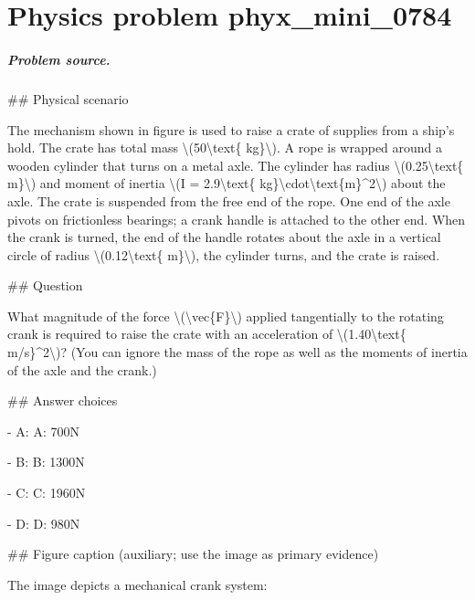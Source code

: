
\chapter{Physics problem phyx\_mini\_0784}
\label{ch:PhyXMiniProblems_problem_phyx_mini_0784}

\paragraph{Problem source.}
\#\# Physical scenario

The mechanism shown in figure is used to raise a crate of supplies from a ship's hold. The crate has total mass \textbackslash{}(50\textbackslash{}text\{ kg\}\textbackslash{}). A rope is wrapped around a wooden cylinder that turns on a metal axle. The cylinder has radius \textbackslash{}(0.25\textbackslash{}text\{ m\}\textbackslash{}) and moment of inertia \textbackslash{}(I = 2.9\textbackslash{}text\{ kg\}\textbackslash{}cdot\textbackslash{}text\{m\}\textasciicircum{}2\textbackslash{}) about the axle. The crate is suspended from the free end of the rope. One end of the axle pivots on frictionless bearings; a crank handle is attached to the other end. When the crank is turned, the end of the handle rotates about the axle in a vertical circle of radius \textbackslash{}(0.12\textbackslash{}text\{ m\}\textbackslash{}), the cylinder turns, and the crate is raised.

\#\# Question

What magnitude of the force \textbackslash{}(\textbackslash{}vec\{F\}\textbackslash{}) applied tangentially to the rotating crank is required to raise the crate with an acceleration of \textbackslash{}(1.40\textbackslash{}text\{ m/s\}\textasciicircum{}2\textbackslash{})? (You can ignore the mass of the rope as well as the moments of inertia of the axle and the crank.)

\#\# Answer choices

- A: A: 700N

- B: B: 1300N

- C: C: 1960N

- D: D: 980N

\#\# Figure caption (auxiliary; use the image as primary evidence)

The image depicts a mechanical crank system:

